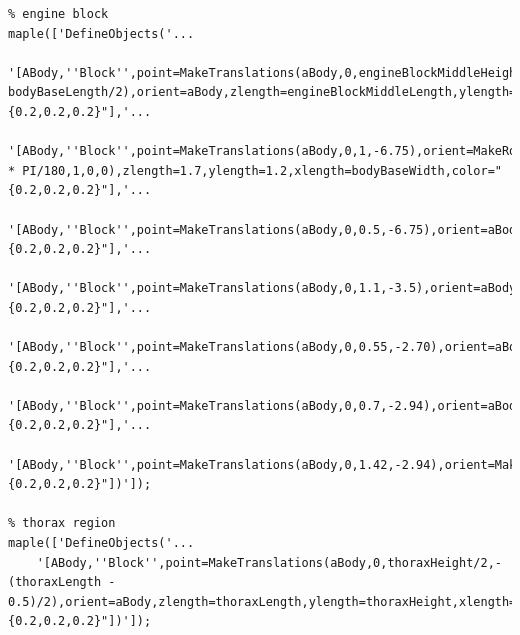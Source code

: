 \documentclass{article}
\begin{document}
\begin{verbatim}
% engine block
maple(['DefineObjects('...
	'[ABody,''Block'',point=MakeTranslations(aBody,0,engineBlockMiddleHeight/2,-bodyBaseLength/2),orient=aBody,zlength=engineBlockMiddleLength,ylength=engineBlockMiddleHeight,xlength=engineBlockMiddleWidth,color="{0.2,0.2,0.2}"],'...
	'[ABody,''Block'',point=MakeTranslations(aBody,0,1,-6.75),orient=MakeRotations(-30 * PI/180,1,0,0),zlength=1.7,ylength=1.2,xlength=bodyBaseWidth,color="{0.2,0.2,0.2}"],'...
	'[ABody,''Block'',point=MakeTranslations(aBody,0,0.5,-6.75),orient=aBody,zlength=1,ylength=1,xlength=bodyBaseWidth,color="{0.2,0.2,0.2}"],'...
	'[ABody,''Block'',point=MakeTranslations(aBody,0,1.1,-3.5),orient=aBody,zlength=0.5,ylength=2.2,xlength=bodyBaseWidth+1,color="{0.2,0.2,0.2}"],'...
	'[ABody,''Block'',point=MakeTranslations(aBody,0,0.55,-2.70),orient=aBody,zlength=1.1,ylength=1.1,xlength=bodyBaseWidth+1,color="{0.2,0.2,0.2}"],'...
	'[ABody,''Block'',point=MakeTranslations(aBody,0,0.7,-2.94),orient=aBody,zlength=1.1,ylength=1.1,xlength=bodyBaseWidth+1,color="{0.2,0.2,0.2}"],'...
	'[ABody,''Block'',point=MakeTranslations(aBody,0,1.42,-2.94),orient=MakeRotations(PI/4,1,0,0),zlength=1.555,ylength=0.7,xlength=bodyBaseWidth+1,color="{0.2,0.2,0.2}"])']);

% thorax region
maple(['DefineObjects('...
	'[ABody,''Block'',point=MakeTranslations(aBody,0,thoraxHeight/2,-(thoraxLength - 0.5)/2),orient=aBody,zlength=thoraxLength,ylength=thoraxHeight,xlength=thoraxWidth,color="{0.2,0.2,0.2}"])']);
	

\end{verbatim}
\end{document}
